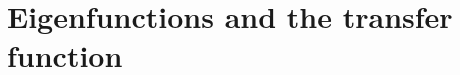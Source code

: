 \documentclass[11pt,a4paper]{book}
\theoremstyle{plain}
\numberwithin{equation}{section}
\newcounter{test}
\begin{document}





\section{Eigenfunctions and the transfer function}\label{sec:eigenf-line-time}
\end{document}
